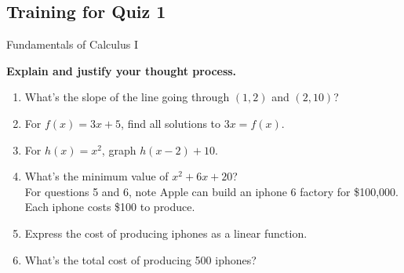 \documentclass[a4paper, 12pt]{article}
\title{}
\date{}
\newcommand{\bt}[1]{\textbf{#1}} %
\begin{document}
\begin{center}
\section*{Training for Quiz 1}
Fundamentals of Calculus I
\end{center}

\bt{Explain and justify your thought process.}
\begin{enumerate}
    \item What's the slope of the line going through $(1, 2)$ and $(2, 10)$?\\

    \item For $f(x) = 3x + 5$, find all solutions to $3x = f(x)$. \\
    \item For $h(x) = x^2$, graph $h(x-2) + 10$. 

    \item What's the minimum value of $x^2 + 6x + 20$? \\

   For questions 5 and 6, note Apple can build an iphone 6 factory for \$100,000. Each iphone costs \$100 to produce. 
    \item Express the cost of producing iphones as a linear function. \\
    \item What's the total cost of producing 500 iphones? \\
\end{enumerate}

\newpage
\end{document}
